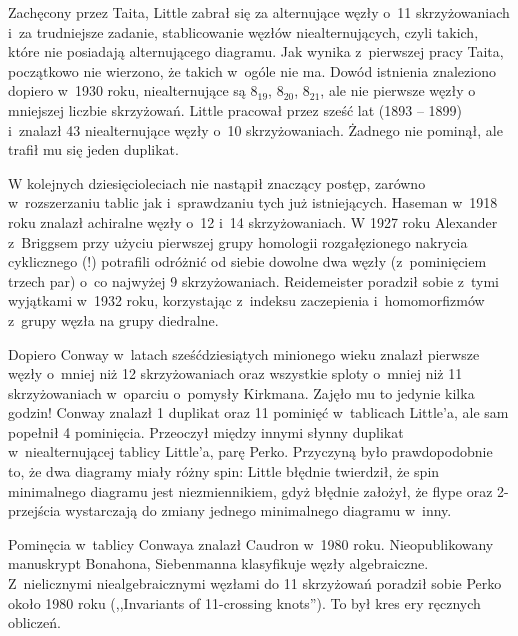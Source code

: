 {Zachęcony przez Taita, Little zabrał się za alternujące węzły o~11 skrzyżowaniach i~za trudniejsze zadanie, stablicowanie węzłów niealternujących, czyli takich, które nie posiadają alternującego diagramu.
Jak wynika z~pierwszej pracy Taita, początkowo nie wierzono, że takich w~ogóle nie ma.
Dowód istnienia znaleziono dopiero w~1930 roku, niealternujące są $8_{19}$, $8_{20}$, $8_{21}$, ale nie pierwsze węzły o mniejszej liczbie skrzyżowań.
Little pracował przez sześć lat (1893 -- 1899) i~znalazł 43 niealternujące węzły o~10 skrzyżowaniach.
Żadnego nie pominął, ale trafił mu się jeden duplikat.

W kolejnych dziesięcioleciach nie nastąpił znaczący postęp, zarówno w~rozszerzaniu tablic jak i~sprawdzaniu tych już istniejących.
Haseman w~1918 roku znalazł achiralne węzły o~12 i~14 skrzyżowaniach.
W 1927 roku Alexander z~Briggsem przy użyciu pierwszej grupy homologii rozgałęzionego nakrycia cyklicznego (!) potrafili odróżnić od siebie dowolne dwa węzły (z~pominięciem trzech par) o~co najwyżej 9 skrzyżowaniach.
Reidemeister poradził sobie z~tymi wyjątkami w~1932 roku, korzystając z~indeksu zaczepienia i~homomorfizmów z~grupy węzła na grupy diedralne.


Dopiero Conway w~latach sześćdziesiątych minionego wieku znalazł pierwsze węzły o~mniej niż 12 skrzyżowaniach oraz wszystkie sploty o~mniej niż 11 skrzyżowaniach w~oparciu o~pomysły Kirkmana.
Zajęło mu to jedynie kilka godzin!
Conway znalazł 1 duplikat oraz 11 pominięć w~tablicach Little'a, ale sam popełnił 4 pominięcia.
Przeoczył między innymi słynny duplikat w~niealternującej tablicy Little'a, parę Perko.
Przyczyną było prawdopodobnie to, że dwa diagramy miały różny spin:
Little błędnie twierdził, że spin minimalnego diagramu jest niezmiennikiem, gdyż błędnie założył, że flype oraz 2-przejścia wystarczają do zmiany jednego minimalnego diagramu w~inny.

Pominęcia w~tablicy Conwaya znalazł Caudron w~1980 roku.
Nieopublikowany manuskrypt Bonahona, Siebenmanna klasyfikuje węzły algebraiczne.
Z~nielicznymi niealgebraicznymi węzłami do 11 skrzyżowań poradził sobie Perko około 1980 roku (,,Invariants of 11-crossing knots'').
To był kres ery ręcznych obliczeń.

}
